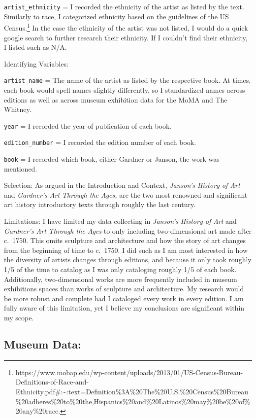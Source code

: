 \documentclass[
  letterpaper,
  DIV=11,
  numbers=noendperiod]{scrreprt}
\begin{document}
\texttt{artist\_ethnicity} = I recorded the ethnicity of the artist as
listed by the text. Similarly to race, I categorized ethnicity based on
the guidelines of the US Census.\footnote{https://www.mobap.edu/wp-content/uploads/2013/01/US-Census-Bureau-Definitions-of-Race-and-Ethnicity.pdf\#:\textasciitilde:text=Definition\%3A\%20The\%20U.S.\%20Census\%20Bureau\%20adheres\%20to\%20the,Hispanics\%20and\%20Latinos\%20may\%20be\%20of\%20any\%20race.}
In the case the ethnicity of the artist was not listed, I would do a
quick google search to further research their ethnicity. If I couldn't
find their ethnicity, I listed such as N/A.

Identifying Variables:

\texttt{artist\_name} = The name of the artist as listed by the
respective book. At times, each book would spell names slightly
differently, so I standardized names across editions as well as across
museum exhibition data for the MoMA and The Whitney.

\texttt{year} = I recorded the year of publication of each book.

\texttt{edition\_number} = I recorded the edition number of each book.

\texttt{book} = I recorded which book, either Gardner or Janson, the
work was mentioned.

Selection: As argued in the Introduction and Context, \emph{Janson's
History of Art} and \emph{Gardner's Art Through the Ages,} are the two
most renowned and significant art history introductory texts through
roughly the last century.

Limitations: I have limited my data collecting in \emph{Janson's History
of Art} and \emph{Gardner's Art Through the Ages} to only including
two-dimensional art made after c.~1750. This omits sculpture and
architecture and how the story of art changes from the beginning of time
to c.~1750. I did such as I am most interested in how the diversity of
artists changes through editions, and because it only took roughly 1/5
of the time to catalog as I was only cataloging roughly 1/5 of each
book. Additionally, two-dimensional works are more frequently included
in museum exhibitions spaces than works of sculpture and architecture.
My research would be more robust and complete had I cataloged every work
in every edition. I am fully aware of this limitation, yet I believe my
conclusions are significant within my scope.

\hypertarget{museum-data}{%
\subsection{Museum Data:}\label{museum-data}}
\end{document}
